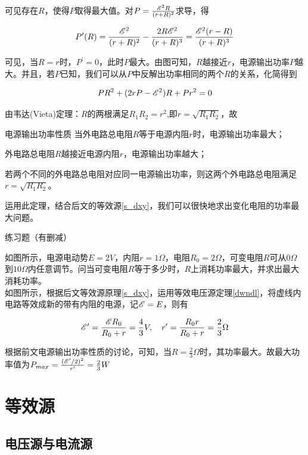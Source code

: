可见存在$R$，使得$P$取得最大值。对$P = \frac{\mathscr{E}^2 R}{(r + R)^2}$求导，得

$$P^{\prime}(R) = \frac{\mathscr{E}^2}{(r+R)^2}-\frac{2 R \mathscr{E}^2}{(r+R)^3} = \frac{\mathscr{E}^2 (r-R)}{(r+R)^3}$$

可见，当$R=r$时，$P^{\prime} = 0$，此时$P$最大。由图可知，$R$越接近$r$，电源输出功率$P$越大。并且，若$P$已知，我们可以从$P$中反解出功率相同的两个$R$的关系，化简得到

$$P R^2 + (2 r P - \mathscr{E}^2)R + P r^2 = 0$$

由韦达(Vieta)定理：$R$的两根满足$R_1 R_2 = r^2$,即$r = \sqrt{R_1 R_2}$，故

\begin{theo}{电源输出功率性质}{}
当外电路总电阻$R$等于电源内阻$r$时，电源输出功率最大；

外电路总电阻$R$越接近电源内阻$r$，电源输出功率越大；

若两个不同的外电路总电阻对应同一电源输出功率，则这两个外电路总电阻满足$r = \sqrt{R_1 R_2}$。
\end{theo}

运用此定理，结合后文的等效源\eqref{s_dxy}，我们可以很快地求出变化电阻的功率最大问题。

\begin{ep}{练习题（有删减）}{}

如图所示，电源电动势$E=2V$，内阻$r=1\Omega$，电阻$R_0=2\Omega$，可变电阻$R$可从$0\Omega$到$10\Omega$内任意调节。问当可变电阻$R$等于多少时，$R$上消耗功率最大，并求出最大消耗功率。
~\\


如图所示，根据后文等效源原理\eqref{s_dxy}，运用等效电压源定理\eqref{dwndl}，将虚线内电路等效成新的带有内阻的电源，记$\mathscr{E} = E$，则有

$$\mathscr{E}^{\prime} = \frac{\mathscr{E} R_0}{R_0 + r} = \frac{4}{3} V ,\quad r^{\prime} = \frac{R_0 r}{R_0 + r} = \frac{2}{3} \Omega$$

根据前文电源输出功率性质的讨论，可知，当$R=\frac{2}{3} \Omega$时，其功率最大。故最大功率值为$P_{max} = \frac{(\mathscr{E}^{\prime} / 2)^2}{r^{\prime}} = \frac{2}{3} W$

\end{ep}

\section{等效源}
\label{s_dxy}

\subsection{电压源与电流源}

